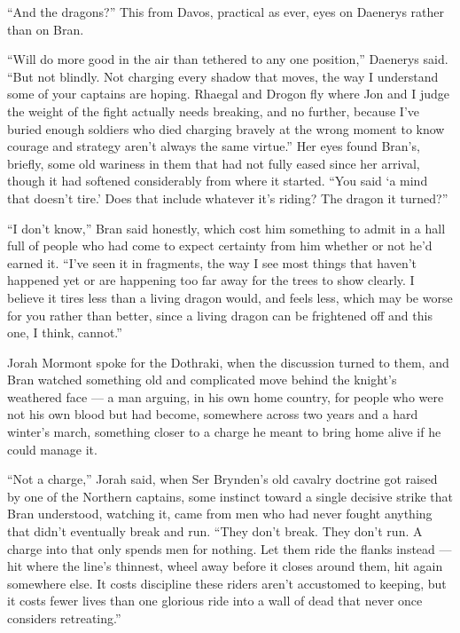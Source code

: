“And the dragons?” This from Davos, practical as ever, eyes on Daenerys rather than on Bran.

“Will do more good in the air than tethered to any one position,” Daenerys said. “But not blindly. Not charging every shadow that moves, the way I understand some of your captains are hoping. Rhaegal and Drogon fly where Jon and I judge the weight of the fight actually needs breaking, and no further, because I’ve buried enough soldiers who died charging bravely at the wrong moment to know courage and strategy aren’t always the same virtue.” Her eyes found Bran’s, briefly, some old wariness in them that had not fully eased since her arrival, though it had softened considerably from where it started. “You said ‘a mind that doesn’t tire.’ Does that include whatever it’s riding? The dragon it turned?”

“I don’t know,” Bran said honestly, which cost him something to admit in a hall full of people who had come to expect certainty from him whether or not he’d earned it. “I’ve seen it in fragments, the way I see most things that haven’t happened yet or are happening too far away for the trees to show clearly. I believe it tires less than a living dragon would, and feels less, which may be worse for you rather than better, since a living dragon can be frightened off and this one, I think, cannot.”

\sceneBreak

Jorah Mormont spoke for the Dothraki, when the discussion turned to them, and Bran watched something old and complicated move behind the knight’s weathered face — a man arguing, in his own home country, for people who were not his own blood but had become, somewhere across two years and a hard winter’s march, something closer to a charge he meant to bring home alive if he could manage it.

“Not a charge,” Jorah said, when Ser Brynden’s old cavalry doctrine got raised by one of the Northern captains, some instinct toward a single decisive strike that Bran understood, watching it, came from men who had never fought anything that didn’t eventually break and run. “They don’t break. They don’t run. A charge into that only spends men for nothing. Let them ride the flanks instead — hit where the line’s thinnest, wheel away before it closes around them, hit again somewhere else. It costs discipline these riders aren’t accustomed to keeping, but it costs fewer lives than one glorious ride into a wall of dead that never once considers retreating.”

